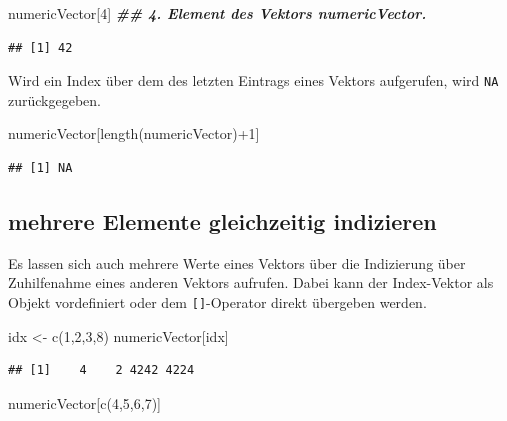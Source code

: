 \documentclass[
]{book}
\newenvironment{Shaded}{\begin{snugshade}}{\end{snugshade}}
\newcommand{\DecValTok}[1]{\textcolor[rgb]{0.00,0.00,0.81}{#1}}
\newcommand{\DocumentationTok}[1]{\textcolor[rgb]{0.56,0.35,0.01}{\textbf{\textit{#1}}}}
\newcommand{\FunctionTok}[1]{\textcolor[rgb]{0.00,0.00,0.00}{#1}}
\newcommand{\NormalTok}[1]{#1}
\newcommand{\OtherTok}[1]{\textcolor[rgb]{0.56,0.35,0.01}{#1}}
\newcommand{\SpecialCharTok}[1]{\textcolor[rgb]{0.00,0.00,0.00}{#1}}
\begin{document}
\begin{Shaded}
\begin{Highlighting}[]
\NormalTok{numericVector[}\DecValTok{4}\NormalTok{] }\DocumentationTok{\#\# 4. Element des Vektors numericVector.}
\end{Highlighting}
\end{Shaded}

\begin{verbatim}
## [1] 42
\end{verbatim}

Wird ein Index über dem des letzten Eintrags eines Vektors aufgerufen, wird \texttt{NA} zurückgegeben.

\begin{Shaded}
\begin{Highlighting}[]
\NormalTok{numericVector[}\FunctionTok{length}\NormalTok{(numericVector)}\SpecialCharTok{+}\DecValTok{1}\NormalTok{]}
\end{Highlighting}
\end{Shaded}

\begin{verbatim}
## [1] NA
\end{verbatim}

\hypertarget{mehrere-elemente-gleichzeitig-indizieren}{%
\subsection{mehrere Elemente gleichzeitig indizieren}\label{mehrere-elemente-gleichzeitig-indizieren}}

Es lassen sich auch mehrere Werte eines Vektors über die Indizierung über Zuhilfenahme eines anderen Vektors aufrufen. Dabei kann der Index-Vektor als Objekt vordefiniert oder dem \texttt{{[}{]}}-Operator direkt übergeben werden.

\begin{Shaded}
\begin{Highlighting}[]
\NormalTok{idx }\OtherTok{\textless{}{-}} \FunctionTok{c}\NormalTok{(}\DecValTok{1}\NormalTok{,}\DecValTok{2}\NormalTok{,}\DecValTok{3}\NormalTok{,}\DecValTok{8}\NormalTok{)}
\NormalTok{numericVector[idx]}
\end{Highlighting}
\end{Shaded}

\begin{verbatim}
## [1]    4    2 4242 4224
\end{verbatim}

\begin{Shaded}
\begin{Highlighting}[]
\NormalTok{numericVector[}\FunctionTok{c}\NormalTok{(}\DecValTok{4}\NormalTok{,}\DecValTok{5}\NormalTok{,}\DecValTok{6}\NormalTok{,}\DecValTok{7}\NormalTok{)]}
\end{Highlighting}
\end{Shaded}
\end{document}
